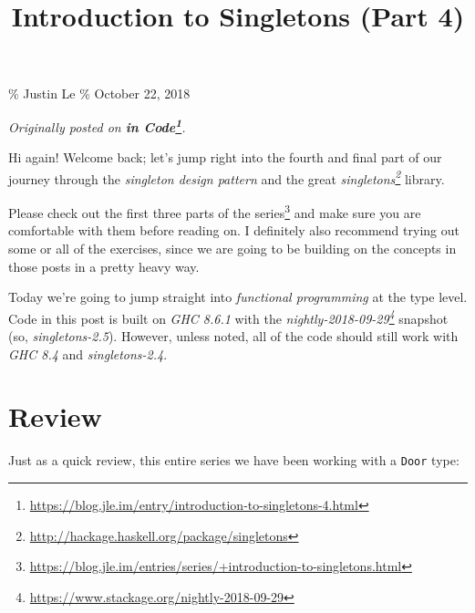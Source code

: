 \documentclass[]{article}
\title{Introduction to Singletons (Part 4)}
\newenvironment{Shaded}{}{}
\newcommand{\CommentTok}[1]{\textcolor[rgb]{0.38,0.63,0.69}{\textit{#1}}}
\newcommand{\DataTypeTok}[1]{\textcolor[rgb]{0.56,0.13,0.00}{#1}}
\newcommand{\KeywordTok}[1]{\textcolor[rgb]{0.00,0.44,0.13}{\textbf{#1}}}
\newcommand{\NormalTok}[1]{#1}
\newcommand{\OperatorTok}[1]{\textcolor[rgb]{0.40,0.40,0.40}{#1}}
\newcommand{\OtherTok}[1]{\textcolor[rgb]{0.00,0.44,0.13}{#1}}
\renewcommand{\href}[2]{#2\footnote{\url{#1}}}
\begin{document}
\maketitle

\% Justin Le \% October 22, 2018

\emph{Originally posted on
\textbf{\href{https://blog.jle.im/entry/introduction-to-singletons-4.html}{in
Code}}.}

Hi again! Welcome back; let's jump right into the fourth and final part of our
journey through the \emph{singleton design pattern} and the great
\emph{\href{http://hackage.haskell.org/package/singletons}{singletons}} library.

Please check out
\href{https://blog.jle.im/entries/series/+introduction-to-singletons.html}{the
first three parts of the series} and make sure you are comfortable with them
before reading on. I definitely also recommend trying out some or all of the
exercises, since we are going to be building on the concepts in those posts in a
pretty heavy way.

Today we're going to jump straight into \emph{functional programming} at the
type level. Code in this post is built on \emph{GHC 8.6.1} with the
\emph{\href{https://www.stackage.org/nightly-2018-09-29}{nightly-2018-09-29}}
snapshot (so, \emph{singletons-2.5}). However, unless noted, all of the code
should still work with \emph{GHC 8.4} and \emph{singletons-2.4}.

\section{Review}\label{review}

Just as a quick review, this entire series we have been working with a
\texttt{Door} type:

\begin{Shaded}
\end{Shaded}
\end{document}
